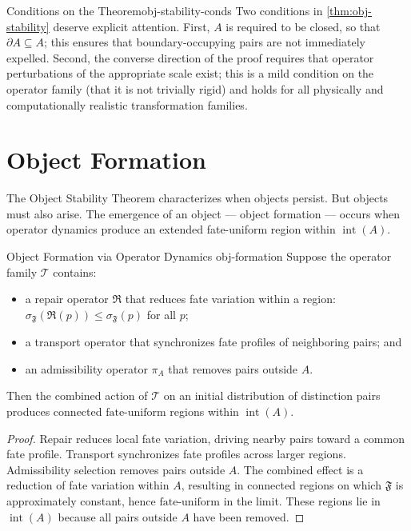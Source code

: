 \documentclass[12pt,twoside,openright]{book}
\newcommand{\repair}{\mathfrak{R}}        %
\newcommand{\transfam}{\mathcal{T}}       %
\newcommand{\fateMap}{\mathfrak{F}}
\newcommand{\fateSens}[1]{\sigma_{\fateMap}(#1)}
\newcommand{\admRegion}{A}
\newcommand{\admOp}{\pi_{\!\admRegion}}
\newcommand{\fateUnif}{\text{fate-uniform}}
\providecommand{\fateSens}[1]{\sigma_{\fateMap}(#1)}
\providecommand{\admRegion}{A}
\providecommand{\admOp}{\pi_{\!\admRegion}}
\providecommand{\fateUnif}{\text{fate-uniform}}
\begin{document}
\begin{remark}{Conditions on the Theorem}{obj-stability-conds}
Two conditions in \cref{thm:obj-stability} deserve explicit
attention. First, $\admRegion$ is required to be closed, so
that $\partial\admRegion\subseteq\admRegion$; this ensures that
boundary-occupying pairs are not immediately expelled.
Second, the converse direction of the proof requires that
operator perturbations of the appropriate scale exist; this is
a mild condition on the operator family (that it is not
trivially rigid) and holds for all physically and computationally
realistic transformation families.
\end{remark}

\section{Object Formation}

The Object Stability Theorem characterizes when objects persist.
But objects must also arise. The emergence of an object ---
object formation --- occurs when operator dynamics produce an
extended fate-uniform region within $\operatorname{int}(\admRegion)$.

\begin{proposition}{Object Formation via Operator Dynamics}%
  {obj-formation}
Suppose the operator family $\transfam$ contains:
\begin{itemize}[nosep,leftmargin=2em]
  \item a repair operator $\repair$ that reduces fate variation
    within a region: $\fateSens{\repair(p)}
    \le\fateSens{p}$ for all $p$;
  \item a transport operator that synchronizes fate profiles of
    neighboring pairs; and
  \item an admissibility operator $\admOp$ that removes pairs
    outside $\admRegion$.
\end{itemize}
Then the combined action of $\transfam$ on an initial
distribution of distinction pairs produces connected
$\fateUnif$ regions within $\operatorname{int}(\admRegion)$.
\begin{proof}
Repair reduces local fate variation, driving nearby pairs
toward a common fate profile. Transport synchronizes fate
profiles across larger regions. Admissibility selection removes
pairs outside $\admRegion$. The combined effect is a reduction
of fate variation within $\admRegion$, resulting in connected
regions on which $\fateMap$ is approximately constant, hence
$\fateUnif$ in the limit. These regions lie in
$\operatorname{int}(\admRegion)$ because all pairs outside
$\admRegion$ have been removed.
\end{proof}
\end{proposition}
\end{document}
